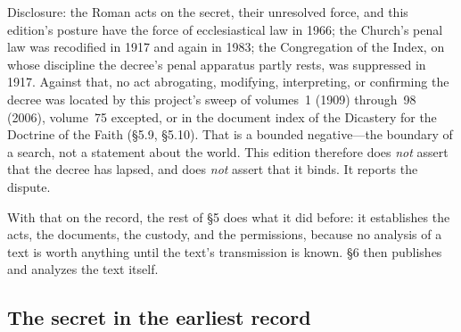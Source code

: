 \begin{statusdossier}{Disclosure: the Roman acts on the secret, their
unresolved force, and this edition's posture}
{have the force of ecclesiastical law in 1966; the Church's penal law
was recodified in 1917 and again in 1983; the Congregation of the
Index, on whose discipline the decree's penal apparatus partly
rests, was suppressed in 1917. Against that, no act abrogating,
modifying, interpreting, or confirming the decree was located by
this project's sweep of  volumes~1
(1909) through~98 (2006), volume~75 excepted, or in the document
index of the Dicastery for the Doctrine of the Faith (\S5.9,
\S5.10). That is a bounded negative---the boundary of a search, not
a statement about the world. This edition therefore does \emph{not}
assert that the decree has lapsed, and does \emph{not} assert that
it binds. It reports the dispute.}
\end{statusdossier}

With that on the record, the rest of \S5 does what it did before:
it establishes the acts, the documents, the custody, and the
permissions, because no analysis of a text is worth anything until
the text's transmission is known. \S6 then publishes and analyzes
the text itself.

\subsection{The secret in the earliest record}


